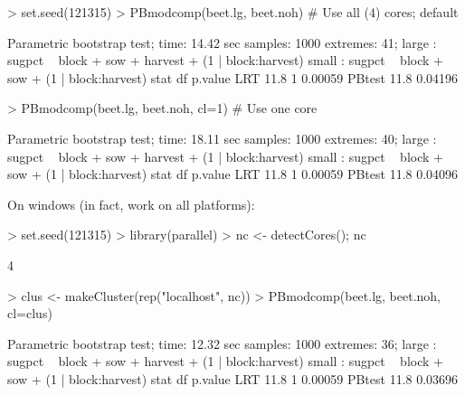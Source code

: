 \begin{sframe}
\begin{sblock}
\begin{Schunk}
\begin{Sinput}
> set.seed(121315)
> PBmodcomp(beet.lg, beet.noh) # Use all (4) cores; default
\end{Sinput}
\begin{Soutput}
Parametric bootstrap test; time: 14.42 sec
samples: 1000 extremes: 41;
large : sugpct ~ block + sow + harvest + (1 | block:harvest)
small : sugpct ~ block + sow + (1 | block:harvest)
       stat df p.value
LRT    11.8  1 0.00059
PBtest 11.8    0.04196
\end{Soutput}
\begin{Sinput}
> PBmodcomp(beet.lg, beet.noh, cl=1) # Use one core
\end{Sinput}
\begin{Soutput}
Parametric bootstrap test; time: 18.11 sec
samples: 1000 extremes: 40;
large : sugpct ~ block + sow + harvest + (1 | block:harvest)
small : sugpct ~ block + sow + (1 | block:harvest)
       stat df p.value
LRT    11.8  1 0.00059
PBtest 11.8    0.04096
\end{Soutput}
\end{Schunk}
\end{sblock}  
\end{sframe}




\begin{sframe}

On windows (in fact, work on all platforms):

   
\begin{sblock}
\begin{Schunk}
\begin{Sinput}
> set.seed(121315)
> library(parallel)
> nc <- detectCores(); nc
\end{Sinput}
\begin{Soutput}
[1] 4
\end{Soutput}
\begin{Sinput}
> clus <- makeCluster(rep("localhost", nc))
> PBmodcomp(beet.lg, beet.noh, cl=clus)
\end{Sinput}
\begin{Soutput}
Parametric bootstrap test; time: 12.32 sec
samples: 1000 extremes: 36;
large : sugpct ~ block + sow + harvest + (1 | block:harvest)
small : sugpct ~ block + sow + (1 | block:harvest)
       stat df p.value
LRT    11.8  1 0.00059
PBtest 11.8    0.03696
\end{Soutput}
\end{Schunk}
\end{sblock}  
\end{sframe}




